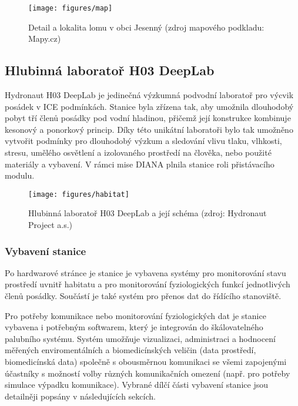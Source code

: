 \begin{figure}[h]
    \begin{center}
        \texttt{[image: figures/map]}
        \caption{Detail a lokalita lomu v obci Jesenný (zdroj mapového podkladu: Mapy.cz)}
        \label{fig:map}
    \end{center}
\end{figure}

\subsection{Hlubinná laboratoř H03 DeepLab}
\label{subsubsec:h03_deeplab}
Hydronaut H03 DeepLab je jedinečná výzkumná podvodní laboratoř pro výcvik
posádek v \gls{ICE} podmínkách. Stanice byla zřízena tak, aby umožnila
dlouhodobý pobyt tří členů posádky pod vodní hladinou, přičemž její konstrukce
kombinuje kesonový a ponorkový princip. Díky této unikátní laboratoři bylo tak
umožněno vytvořit podmínky pro dlouhodobý výzkum a sledování vlivu tlaku,
vlhkosti, stresu, umělého osvětlení a izolovaného prostředí na člověka, nebo
použité materiály a vybavení. V rámci mise DIANA plnila stanice roli
přistávacího modulu.

\begin{figure}[h]
    \begin{center}
        \texttt{[image: figures/habitat]}
        \caption{Hlubinná laboratoř H03 DeepLab a její schéma (zdroj: Hydronaut Project a.s.)}
        \label{fig:habitat}
    \end{center}
\end{figure}

\subsubsection{Vybavení stanice}
\label{subsubsec:vybaveni_stanice}
Po hardwarové stránce je stanice je vybavena systémy pro monitorování stavu
prostředí uvnitř habitatu a pro monitorování fyziologických funkcí jednotlivých
členů posádky. Součástí je také systém pro přenos dat do řídícího stanoviště.

Pro potřeby komunikace nebo monitorování fyziologických dat je stanice vybavena
i potřebným softwarem, který je integrován do škálovatelného palubního systému.
Systém umožňuje vizualizaci, administraci a hodnocení měřených enviromentálních
a biomedicínských veličin (data prostředí, biomedicínská data) společně s
obousměrnou komunikaci se všemi zapojenými účastníky s možností volby různých
komunikačních omezení (např. pro potřeby simulace výpadku komunikace). Vybrané
dílčí části vybavení stanice jsou detailněji popsány v následujících sekcích.

